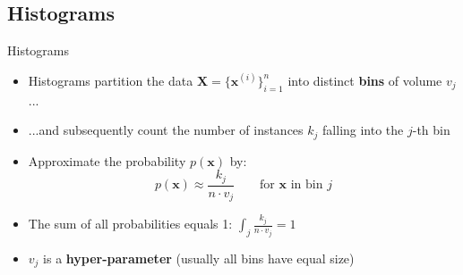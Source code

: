 \subsection{Histograms}

\begin{frame}{Histograms}{}
	\begin{itemize}
		\item Histograms partition the data $\bm{X} = \{ \bm{x}^{(i)} \}_{i=1}^n$ into distinct \textbf{bins} of volume $v_j$...
		\item ...and subsequently count the number of instances $k_j$ falling into the $j$-th bin
		\item Approximate the probability $p(\bm{x})$ by:
		\begin{equation}
			p(\bm{x}) \approx \frac{k_j}{n \cdot v_j}\qquad \text{for $\bm{x}$ in bin $j$}
		\end{equation}
		\item The sum of all probabilities equals 1: $\int_j \frac{k_j}{n \cdot v_j} = 1$
		\item $v_j$ is a \textbf{hyper-parameter} (usually all bins have equal size) 
	\end{itemize}
\end{frame}


